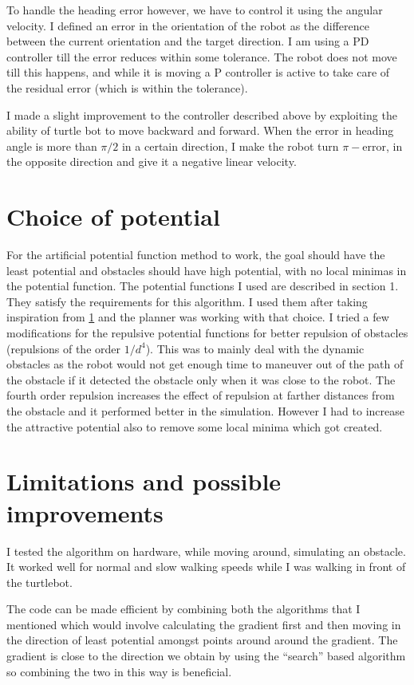 \documentclass[11pt]{article}
\begin{document}
To handle the heading error however, we have to control it using the angular velocity. I defined an error in the orientation of the robot as the difference between the current orientation and the target direction. 
I am using a PD controller till the error reduces within some tolerance. The robot does not move till this happens, and while it is moving a P controller is active to take care of the residual error (which is within the tolerance). 

I made a slight improvement to the controller described above by exploiting the 
ability of turtle bot to move backward and forward. When the error in heading angle is more than $\pi/2$
in a certain direction, I make the robot turn $\pi - \text{error}$, in the opposite direction and give it a negative linear velocity.

\section{Choice of potential}
For the artificial potential function method to work, the goal should have the least potential and obstacles should have high potential, with no local minimas in the potential function. The potential functions I used are described in section 1. They satisfy the requirements for this algorithm. I used them 
after taking inspiration from \hyperref[foo]{1} and the planner was working with that choice. I tried a few modifications for the repulsive potential functions for better repulsion of obstacles (repulsions of the order $1/d^4$). This was to mainly deal with the dynamic obstacles as the robot would not get enough time to maneuver out of the path of the obstacle if it detected the obstacle only when it was close to the robot.
The fourth order repulsion increases the effect of repulsion at farther distances from the obstacle and it performed better in the simulation. However I had to increase the attractive potential also to remove some local minima which got created. 
\section{Limitations and possible improvements}
I tested the algorithm on hardware, while moving around, simulating an obstacle. It worked well for normal and slow walking speeds while I was walking in front of the turtlebot.
 
The code can be made efficient by combining both the algorithms that I mentioned which would involve calculating the gradient first and then 
moving in the direction of least potential amongst points around around the gradient. The gradient is close to the direction we obtain by using the ``search'' based algorithm so combining the two in this way is beneficial.
\end{document}
